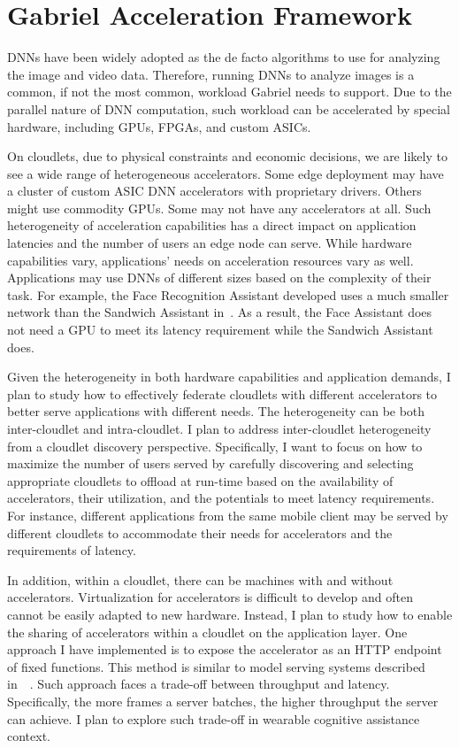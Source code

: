 \section{Gabriel Acceleration Framework}

DNNs have been widely adopted as the de facto algorithms to use for analyzing
the image and video data. Therefore, running DNNs to analyze images is a common, if
not the most common, workload Gabriel needs to support. Due to the parallel
nature of DNN computation, such workload can be accelerated by special
hardware, including GPUs, FPGAs, and custom ASICs.

On cloudlets, due to physical constraints and economic decisions, we are
likely to see a wide range of heterogeneous accelerators. Some edge deployment
may have a cluster of custom ASIC DNN accelerators with proprietary drivers.
Others might use commodity GPUs. Some may not have any accelerators at all. Such
heterogeneity of acceleration capabilities has a direct impact on application
latencies and the number of users an edge node can serve. While hardware
capabilities vary, applications' needs on acceleration resources vary as well.
Applications may use DNNs of different sizes based on the complexity of their
task. For example, the Face Recognition Assistant developed uses a much smaller
network than the Sandwich Assistant in~\cite{chen2017empirical}. As a result,
the Face Assistant does not need a GPU to meet its latency requirement while
the Sandwich Assistant does.

Given the heterogeneity in both hardware capabilities and application demands, I
plan to study how to effectively federate cloudlets with different accelerators
to better serve applications with different needs. The heterogeneity can be both
inter-cloudlet and intra-cloudlet. I plan to address inter-cloudlet
heterogeneity from a cloudlet discovery perspective. Specifically, I want to focus
on how to maximize the number of users served by carefully discovering and
selecting appropriate cloudlets to offload at run-time based on the availability
of accelerators, their utilization, and the potentials to meet latency
requirements. For instance, different applications from the same mobile client
may be served by different cloudlets to accommodate their needs for accelerators and
the requirements of latency.

In addition, within a cloudlet, there can be machines with and without
accelerators. Virtualization for accelerators is difficult to develop and often
cannot be easily adapted to new hardware. Instead, I plan to study how to enable
the sharing of accelerators within a cloudlet on the application layer. One
approach I have implemented is to expose the accelerator as an HTTP endpoint of
fixed functions. This method is similar to model serving systems described
in~\cite{olston2017tensorflow}~\cite{crankshaw2017clipper}. Such approach faces
a trade-off between throughput and latency. Specifically, the more frames a
server batches, the higher throughput the server can achieve. I plan to explore
such trade-off in wearable cognitive assistance context.
